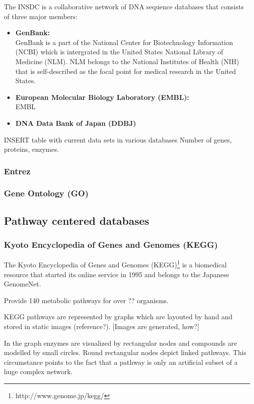 The INSDC is a collaborative network of DNA sequence databases that consists of three major members:
\begin{itemize}
 \item \textbf{GenBank:} \\
 GenBank is a part of the National Center for Biotechnology Information (NCBI) which is intergrated in the United States National Library of Medicine (NLM). NLM belongs to the National Institutes of Health (NIH) that is self-described as the focal point for medical research in the United States.
 \item \textbf{European Molecular Biology Laboratory (EMBL):} \\
 EMBL
 \item \textbf{DNA Data Bank of Japan (DDBJ)} \\
\end{itemize}

INSERT table with current data sets in various databases
Number of genes, proteins, enzymes.

\subsubsection{Entrez}

\subsubsection{Gene Ontology (GO)}

\subsection{Pathway centered databases}

\subsubsection{Kyoto Encyclopedia of Genes and Genomes (KEGG)}

The Kyoto Encyclopedia of Genes and Genomes (KEGG)\footnote{http://www.genome.jp/kegg/} is a biomedical resource that started its online service in 1995 and belongs to the Japanese GenomeNet.

Provide 140 metabolic pathways for over ?? organisms.

KEGG pathways are represented by graphs which are layouted by hand and stored in static images (reference?). [Images are generated, how?]

In the graph enzymes are visualized by rectangular nodes and compounds are modelled by small circles. Round rectangular nodes depict linked pathways. This circumstance points to the fact that a pathway is only an artificial subset of a huge complex network. 

